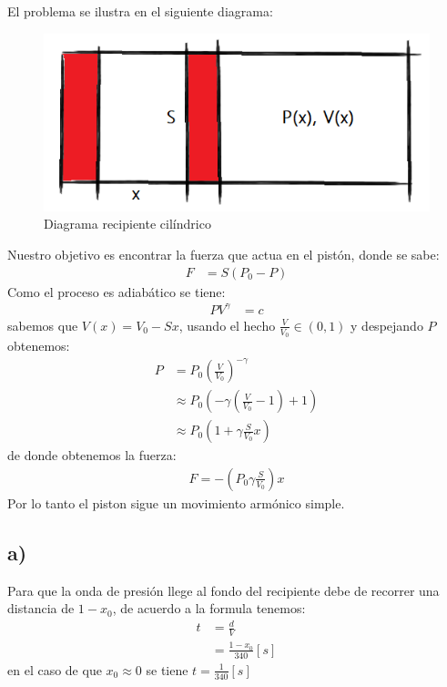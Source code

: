 \documentclass{article}
\begin{document}
\begin{tcolorbox}[breakable]
    El problema se ilustra en el siguiente diagrama:
    \begin{figure}[H]
        \centering
        \includegraphics[scale=0.7]{images/p5_piston.png}
        \caption{Diagrama recipiente cilíndrico}
    \end{figure}
    Nuestro objetivo es encontrar la fuerza que actua en el pistón, donde se 
    sabe:
    \begin{align*}
        F &= S(P_0-P)
    \end{align*}
    Como el proceso es adiabático se tiene:
    \begin{align*}
        PV^{\gamma} &= c
    \end{align*}
    sabemos que $V(x) = V_0-Sx$, usando el hecho $\frac{V}{V_0} \in (0,1)$ y
    despejando $P$ obtenemos:
    \begin{align*}
        P &= P_0 \left( \frac{V}{V_0} \right)^{-\gamma} \\ 
        &\approx P_0 \left(-\gamma \left(\frac{V}{V_0}-1\right) + 1\right)  \\
        &\approx P_0 \left(1+\gamma \frac{S}{V_0}x \right)
    \end{align*}
    de donde obtenemos la fuerza:
    \begin{align*}
        F = -\left(P_0\gamma \frac{S}{V_0}\right)x 
    \end{align*}
    Por lo tanto el piston sigue un movimiento armónico simple. 
    \subsection*{a)}
    Para que la onda de presión llege al fondo del recipiente debe de recorrer una 
    distancia de $1-x_0$, de acuerdo a la formula tenemos:
    \begin{align*}
        t 
        &= \frac{d}{V} \\
        &= \frac{1-x_0}{340}[s]
    \end{align*}
    en el caso de que $x_0 \approx 0$ se tiene $t = \frac{1}{340}[s]$

\end{tcolorbox}
\end{document}
